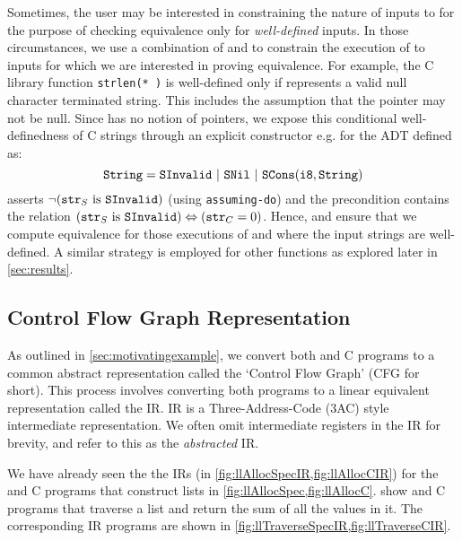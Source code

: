 Sometimes, the user may be interested in constraining the nature of inputs to \cprog{}
for the purpose of checking equivalence only for {\em well-defined} inputs.
In those circumstances, we use a combination of \pre{} and \sdef{} to constrain
the execution of \cprog{} to inputs for which we are interested in proving equivalence.
For example, the C library function {\tt strlen(* )} is well-defined only if 
represents a valid null character terminated string.
This includes the assumption that the pointer  may not be null.
Since \SpecL{} has no notion of pointers, we expose this conditional well-definedness of C strings
through an explicit constructor e.g.  for the  ADT defined as:
$$
\type{String}=\cons{SInvalid}\ |\ \cons{SNil}\ |\ \cons{SCons}(\type{i8}, \type{String})
$$
\sdef{} asserts $\neg({\tt str}_{S}\ \mathrm{is}\ {\tt SInvalid})$ (using {\tt assuming-do}) and
the precondition \pre{} contains the relation $({\tt str}_{S}\ \mathrm{is}\ {\tt SInvalid}) \Leftrightarrow ({\tt str}_{C}=0)$.
Hence, \sdef{} and \pre{} ensure that we compute equivalence for those
executions of \sprog{} and \cprog{} where the input strings are well-defined.
A similar strategy is employed for other functions as explored later in \cref{sec:results}.




\subsection{Control Flow Graph Representation}
\label{sec:ir}
As outlined in \cref{sec:motivatingexample}, we convert both \SpecL{} and C programs to a common
abstract representation called the `Control Flow Graph' (CFG for short).
This process involves converting both programs to a linear equivalent representation called the IR.
IR is a Three-Address-Code (3AC) style intermediate representation.
We often omit intermediate registers in the IR for brevity,
and refer to this as the {\em abstracted} IR.

We have already seen the the IRs (in \cref{fig:llAllocSpecIR,fig:llAllocCIR}) for the \SpecL{} and C programs
that construct lists in \cref{fig:llAllocSpec,fig:llAllocC}.
 show \SpecL{} and C programs that traverse a list
and return the sum of all the values in it.
The corresponding IR programs are shown in \cref{fig:llTraverseSpecIR,fig:llTraverseCIR}.

